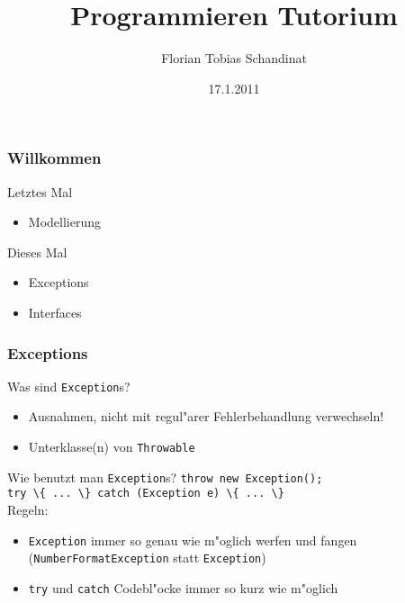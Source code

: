 \documentclass{beamer}
\title{Programmieren Tutorium}
\author{Florian Tobias Schandinat}
\date{17.1.2011}
\institute{FTS}
\begin{document}
\begin{frame}
\frametitle{Willkommen}
\pause
\begin{alertblock}{Letztes Mal}
\begin{itemize}
\item Modellierung
\end{itemize}
\end{alertblock}

\begin{block}{Dieses Mal}
\begin{itemize}
\item Exceptions
\item Interfaces
\end{itemize}
\end{block}
\end{frame}


\begin{frame}
\frametitle{Exceptions}
\begin{block}{Was sind \texttt{Exception}s?}\pause
\begin{itemize}
\item \alert{Ausnahmen}, nicht mit regul"arer Fehlerbehandlung verwechseln!\pause
\item Unterklasse(n) von \texttt{Throwable}
\end{itemize}
\end{block}

\pause

\begin{block}{Wie benutzt man \texttt{Exception}s?}\pause
\lstinline|throw new Exception();|\\
\lstinline|try \{ ... \} catch (Exception e) \{ ... \}|\\
Regeln:\pause
\begin{itemize}
\item \texttt{Exception} immer so genau wie m"oglich werfen und fangen (\texttt{NumberFormatException} statt \texttt{Exception})
\item \texttt{try} und \texttt{catch} Codebl"ocke immer so kurz wie m"oglich
\end{itemize}
\end{block}
\end{frame}
\end{document}
